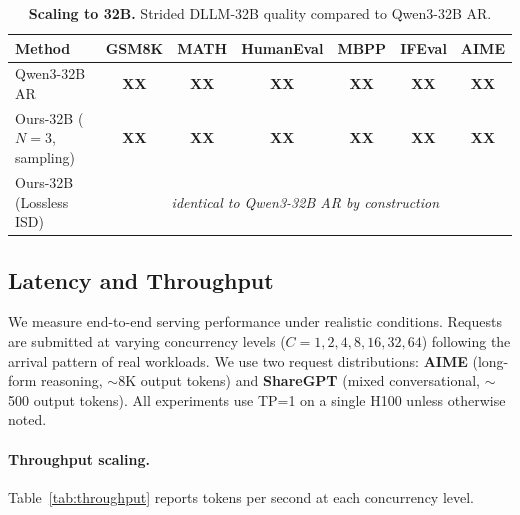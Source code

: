 \begin{table}[t]
\centering
\caption{\textbf{Scaling to 32B.} Strided DLLM-32B quality compared to Qwen3-32B AR.}
\label{tab:32b_results}
\small
\begin{tabular}{lcccccc}
\toprule
\textbf{Method} & \textbf{GSM8K} & \textbf{MATH} & \textbf{HumanEval} & \textbf{MBPP} & \textbf{IFEval} & \textbf{AIME} \\
\midrule
Qwen3-32B AR & \textbf{XX} & \textbf{XX} & \textbf{XX} & \textbf{XX} & \textbf{XX} & \textbf{XX} \\
Ours-32B ($N{=}3$, sampling) & \textbf{XX} & \textbf{XX} & \textbf{XX} & \textbf{XX} & \textbf{XX} & \textbf{XX} \\
Ours-32B (Lossless ISD) & \multicolumn{6}{c}{\emph{identical to Qwen3-32B AR by construction}} \\
\bottomrule
\end{tabular}
\end{table}

\subsection{Latency and Throughput}
\label{sec:throughput}

We measure end-to-end serving performance under realistic conditions. Requests are submitted at varying concurrency levels ($C = 1, 2, 4, 8, 16, 32, 64$) following the arrival pattern of real workloads. We use two request distributions: \textbf{AIME} (long-form reasoning, ${\sim}$8K output tokens) and \textbf{ShareGPT} (mixed conversational, ${\sim}$500 output tokens). All experiments use TP=1 on a single H100 unless otherwise noted.

\paragraph{Throughput scaling.}
Table~\ref{tab:throughput} reports tokens per second at each concurrency level.

